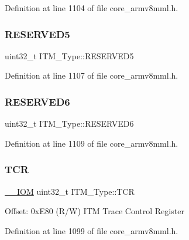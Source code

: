 Definition at line 1104 of file core\+\_\+armv8mml.\+h.

\mbox{\label{struct_i_t_m___type_a14f6f27ef518e4bf31aabb8f17cf4229}} 
\subsubsection{\texorpdfstring{R\+E\+S\+E\+R\+V\+E\+D5}{RESERVED5}}
{\footnotesize\ttfamily uint32\+\_\+t I\+T\+M\+\_\+\+Type\+::\+R\+E\+S\+E\+R\+V\+E\+D5}



Definition at line 1107 of file core\+\_\+armv8mml.\+h.

\mbox{\label{struct_i_t_m___type_ae2fb450d0636c855ffb24185aed7f726}} 
\subsubsection{\texorpdfstring{R\+E\+S\+E\+R\+V\+E\+D6}{RESERVED6}}
{\footnotesize\ttfamily uint32\+\_\+t I\+T\+M\+\_\+\+Type\+::\+R\+E\+S\+E\+R\+V\+E\+D6}



Definition at line 1109 of file core\+\_\+armv8mml.\+h.

\mbox{\label{struct_i_t_m___type_a04b9fbc83759cb818dfa161d39628426}} 
\subsubsection{\texorpdfstring{T\+CR}{TCR}}
{\footnotesize\ttfamily \hyperlink{core__sc300_8h_ab6caba5853a60a17e8e04499b52bf691}{\+\_\+\+\_\+\+I\+OM} uint32\+\_\+t I\+T\+M\+\_\+\+Type\+::\+T\+CR}

Offset\+: 0x\+E80 (R/W) I\+TM Trace Control Register 

Definition at line 1099 of file core\+\_\+armv8mml.\+h.

